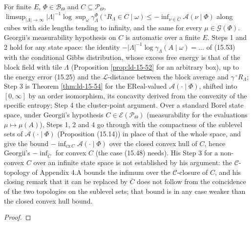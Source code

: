 \begin{theorem}
    For finite $E$, $\Phi \in \mathcal B_\Theta$ and $C \subseteq \mathcal P_\Theta$,
    $\limsup_{|\Lambda|\to\infty}|\Lambda|^{-1}\log\sup_\omega\gamma^\Phi_\Lambda({}^\circ R_\Lambda \in C\mid\omega)
    \leq -\inf_{\nu\in\bar C}\mathcal A(\nu\mid\Phi)$ along cubes with side lengths tending to
    infinity, and the same for every $\mu \in \mathcal G(\Phi)$. Georgii's measurability hypothesis
    on $C$ is automatic over a finite $E$. Steps 1 and 2 hold for any state space: the identity
    $-|\Lambda|^{-1}\log\gamma_\Lambda(A\mid\omega) = \ldots$ of (15.53) with the conditional
    Gibbs distribution, whose excess free energy is that of the block field with tile $\Lambda$
    (Proposition \ref{prop:ld-15-52} for an arbitrary box), up to the energy error (15.25) and the
    $\mathcal L$-distance between the block average and $\gamma\,{}^\circ R_\Lambda$; Step 3 is
    Theorem \ref{thm:ld-15-54} for the $\mathrm{EReal}$-valued $\mathcal A(\cdot\mid\Phi)$, shifted
    into $[0,\infty]$ by an order isomorphism, its concavity derived from the convexity of the
    specific entropy; Step 4 the cluster-point argument. Over a standard Borel state space, under
    Georgii's hypothesis $C \in \mathcal E(\mathcal P_\Theta)$ (measurability for the evaluations
    $\mu \mapsto \mu(A)$), Steps 1, 2 and 4 go through with the compactness of the sublevel sets of
    $\mathcal A(\cdot\mid\Phi)$ (Proposition (15.14)) in place of that of the whole space, and give
    the bound $-\inf_{\overline{\mathrm{cx}}\,C}\mathcal A(\cdot\mid\Phi)$ over the closed convex hull of
    $C$, hence Georgii's $-\inf_{\bar C}$ for convex $C$ (the case (15.48) needs). His Step 3 for a
    non-convex $C$ over an infinite state space is not established by his argument: the
    $\mathcal C$-topology of Appendix 4.A bounds the infimum over the $\mathcal C$-closure of $C$,
    and his closing remark that it can be replaced by $\bar C$ does not follow from the coincidence
    of the two topologies on the sublevel sets; that bound is in any case weaker than the closed
    convex hull bound.
\end{theorem}
\begin{proof}
    \leanok
\end{proof}

